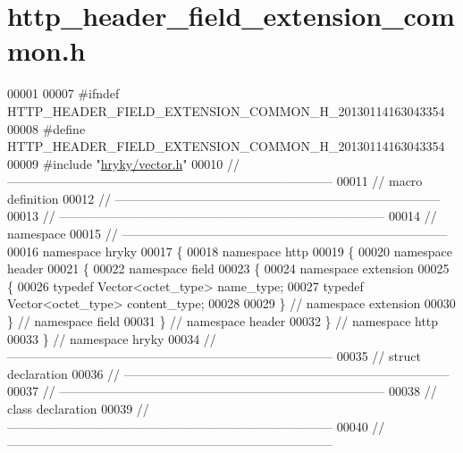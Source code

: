 \hypertarget{http__header__field__extension__common_8h_source}{\section{http\-\_\-header\-\_\-field\-\_\-extension\-\_\-common.\-h}
}

\begin{DoxyCode}
00001 
00007 \textcolor{preprocessor}{#ifndef HTTP\_HEADER\_FIELD\_EXTENSION\_COMMON\_H\_20130114163043354}
00008 \textcolor{preprocessor}{}\textcolor{preprocessor}{#define HTTP\_HEADER\_FIELD\_EXTENSION\_COMMON\_H\_20130114163043354}
00009 \textcolor{preprocessor}{}\textcolor{preprocessor}{#include "\hyperlink{vector_8h}{hryky/vector.h}"}
00010 \textcolor{comment}{//
      ------------------------------------------------------------------------------}
00011 \textcolor{comment}{// macro definition}
00012 \textcolor{comment}{//
      ------------------------------------------------------------------------------}
00013 \textcolor{comment}{//
      ------------------------------------------------------------------------------}
00014 \textcolor{comment}{// namespace}
00015 \textcolor{comment}{//
      ------------------------------------------------------------------------------}
00016 \textcolor{keyword}{namespace }hryky
00017 \{
00018 \textcolor{keyword}{namespace }http
00019 \{
00020 \textcolor{keyword}{namespace }header
00021 \{
00022 \textcolor{keyword}{namespace }field
00023 \{
00024 \textcolor{keyword}{namespace }extension
00025 \{
00026     \textcolor{keyword}{typedef} Vector<octet\_type> name\_type;
00027     \textcolor{keyword}{typedef} Vector<octet\_type> content\_type;
00028     
00029 \} \textcolor{comment}{// namespace extension}
00030 \} \textcolor{comment}{// namespace field}
00031 \} \textcolor{comment}{// namespace header}
00032 \} \textcolor{comment}{// namespace http}
00033 \} \textcolor{comment}{// namespace hryky}
00034 \textcolor{comment}{//
      ------------------------------------------------------------------------------}
00035 \textcolor{comment}{// struct declaration}
00036 \textcolor{comment}{//
      ------------------------------------------------------------------------------}
00037 \textcolor{comment}{//
      ------------------------------------------------------------------------------}
00038 \textcolor{comment}{// class declaration}
00039 \textcolor{comment}{//
      ------------------------------------------------------------------------------}
00040 \textcolor{comment}{//
      ------------------------------------------------------------------------------}

\end{DoxyCode}
